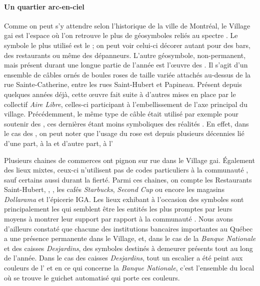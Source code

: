 \paragraph{Un quartier arc-en-ciel}
Comme on peut s'y attendre selon l'historique de la ville de Montréal, le Village gai est l'espace où l'on retrouve le plus de géosymboles reliés au spectre \lgbt{}.
Le symbole le plus utilisé est le  ; on peut voir celui-ci décorer autant pour des bars, des restaurants ou même des dépanneurs.
L'autre géosymbole, non-permanent, mais présent durant une longue partie de l'année est l'œuvre des .
Il s'agit d'un ensemble de câbles ornés de boules roses de taille variée attachés au-dessus de la rue Sainte-Catherine, entre les rues Saint-Hubert et Papineau.
Présent depuis quelques années déjà, cette œuvre fait suite à d'autres mises en place par le collectif \emph{Aire Libre}, celles-ci participant à l'embellissement de l'axe principal du village.
Précédemment, le même type de câble était utilisé par exemple pour soutenir des , ces dernières étant moins symboliques des réalités \lgbt{}.
En effet, dans le cas des , on peut noter que l'usage du rose est depuis plusieurs décennies lié d'une part, à la  et d'autre part, à l'

Plusieurs chaines de commerces ont pignon sur rue dans le Village gai.
Également des lieux mixtes, ceux-ci n'utilisent pas de codes particuliers à la communauté \lgbt, sauf certains aussi durant la fierté.
Parmi ces chaines, on compte les Restaurants Saint-Hubert, , , les cafés \emph{Starbucks}, \emph{Second Cup} ou encore les magasins \emph{Dollarama} et l'épicerie IGA.
Les lieux exhibant à l'occasion des symboles sont principalement les  qui semblent être les entités les plus promptes par leurs moyens à montrer leur support par rapport à la communauté \lgbt.
Nous avons d'ailleurs constaté que chacune des institutions bancaires importantes au Québec a une présence permanente dans le Village, et, dans le cas de la \emph{Banque Nationale} et des caisses \emph{Desjardins}, des symboles \lgbt{} destinés  à demeurer présents tout au long de l'année.
Dans le cas des caisses \emph{Desjardins}, tout un escalier a été peint aux couleurs de l' et en ce qui concerne la \emph{Banque Nationale}, c'est l'ensemble du local où se trouve le guichet automatisé qui porte ces couleurs.


